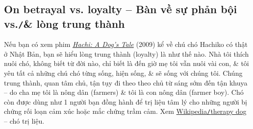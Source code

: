 \documentclass[12pt,twoside]{book}
\begin{document}
\subsection{On betrayal vs. loyalty -- Bàn về sự phản bội vs.{\tt/}\& lòng trung thành}
Nếu bạn có xem phim \href{https://www.imdb.com/title/tt1028532/}{\it Hachi: A Dog's Tale} (2009) kể về chú chó {\sc Hachiko} có thật ở Nhật Bản, bạn sẽ hiểu lòng trung thành (loyalty) là như thế nào. Nhà tôi thích nuôi chó, không biết từ đời nào, chỉ biết là đến giờ mẹ tôi vẫn nuôi vài con, \& tôi yêu tất cả những chú chó từng sống, hiện sống, \& sẽ sống với chúng tôi. Chúng trung thành, quan tâm chủ, tận tụy đi theo theo chủ từ sáng sớm đến tận khuya -- do cha mẹ tôi là nông dân (farmers) \& tôi là con nông dân (farmer boy). Chó còn được dùng như 1 người bạn đồng hành để trị liệu tâm lý cho những người bị chứng rối loạn cảm xúc hoặc mắc chứng trầm cảm. Xem \href{https://en.wikipedia.org/wiki/Therapy_dog}{Wikipedia{\tt/}therapy dog} -- chó trị liệu.
\end{document}
